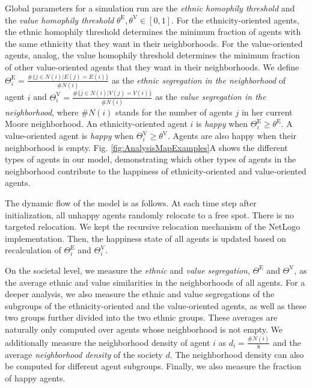 \documentclass{ws-acs}
\begin{document}
{Global parameters for a simulation run are the {\it ethnic homophily threshold} and the {\it value homophily threshold} $\theta^\text{E}, \theta^\text{V} \in [0,1]$. For the ethnicity-oriented agents, the ethnic homophily threshold determines the minimum fraction of agents with the same ethnicity that they want in their neighborhoods. For the value-oriented agents, analog, the value homophily threshold determines the minimum fraction of other value-oriented agents that they want in their neighborhoods. We define $\Theta^\text{E}_i = \frac{\#\{j \in N(i) | E(j)=E(i)\}}{\#N(i)}$ as the {\it ethnic segregation in the neighborhood} of agent $i$ and $\Theta^\text{V}_i = \frac{\#\{j \in N(i) | V(j)=V(i)\}}{\#N(i)}$ as the {\it value segregation in the neighborhood}, where $\#N(i)$ stands for the number of agents $j$ in her current Moore neighborhood. An ethnicity-oriented agent $i$ is {\it happy} when $\Theta^\text{E}_i \geq \theta^\text{E}$. A value-oriented agent is {\it happy} when $\Theta^\text{V}_i \geq \theta^\text{V}$. Agents are also happy when their neighborhood is empty. Fig. \ref{fig:AnalysisMapExamples}A shows the different types of agents in our model, demonstrating which other types of agents in the neighborhood contribute to the happiness of ethnicity-oriented and value-oriented agents.

The dynamic flow of the model is as follows. 
At each time step after initialization, all unhappy agents randomly relocate to a free spot. There is no targeted relocation. We kept the recursive relocation mechanism of the NetLogo implementation. Then, the happiness state of all agents is updated based on recalculation of $\Theta^\text{E}_i$ and $\Theta^\text{V}_i$.  

On the societal level, we measure the {\it ethnic} and {\it value segregation}, $\Theta^\text{E}$ and $\Theta^\text{V}$, as the average ethnic and value similarities in the neighborhoods of all agents. For a deeper analysis, we also measure the ethnic and value segregations of the subgroups of the ethnicity-oriented and the value-oriented agents, as well as these two groups further divided into the two ethnic groups. These averages are naturally only computed over agents whose neighborhood is not empty. We additionally measure the neighborhood density of agent $i$ as $d_i = \frac{\#N(i)}{8}$ and the average {\it neighborhood density} of the society $d$. The neighborhood density can also be computed for different agent subgroups.
Finally, we also measure the fraction of happy agents. 

}
\end{document}
